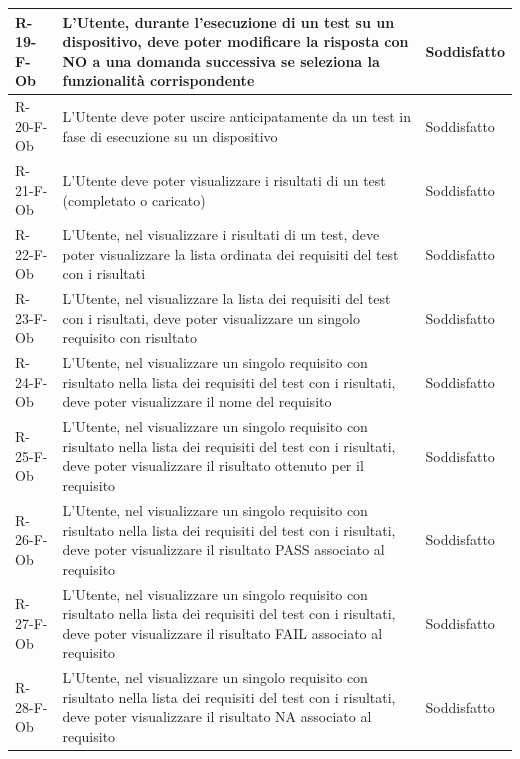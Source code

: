 \documentclass[a4paper,12pt]{article}
\begin{document}
{{\begin{longtable}{|l|p{}|p{}|}
                R-19-F-Ob       & L'Utente, durante l'esecuzione di un test su un dispositivo, deve poter modificare la risposta con NO a una domanda successiva se seleziona la funzionalità corrispondente                         & Soddisfatto \\ \hline
                R-20-F-Ob       & L'Utente deve poter uscire anticipatamente da un test in fase di esecuzione su un dispositivo                                                                                               & Soddisfatto \\ \hline
                R-21-F-Ob       & L'Utente deve poter visualizzare i risultati di un test (completato o caricato)                                                                                                             & Soddisfatto \\ \hline
                R-22-F-Ob       & L'Utente, nel visualizzare i risultati di un test, deve poter visualizzare la lista ordinata dei requisiti del test con i risultati                                                         & Soddisfatto \\ \hline
                R-23-F-Ob       & L'Utente, nel visualizzare la lista dei requisiti del test con i risultati, deve poter visualizzare un singolo requisito con risultato                                                      & Soddisfatto \\ \hline
                R-24-F-Ob       & L'Utente, nel visualizzare un singolo requisito con risultato nella lista dei requisiti del test con i risultati, deve poter visualizzare il nome del requisito                             & Soddisfatto \\ \hline
                R-25-F-Ob       & L'Utente, nel visualizzare un singolo requisito con risultato nella lista dei requisiti del test con i risultati, deve poter visualizzare il risultato ottenuto per il requisito            & Soddisfatto \\ \hline
                R-26-F-Ob       & L'Utente, nel visualizzare un singolo requisito con risultato nella lista dei requisiti del test con i risultati, deve poter visualizzare il risultato PASS associato al requisito            & Soddisfatto \\ \hline
                R-27-F-Ob       & L'Utente, nel visualizzare un singolo requisito con risultato nella lista dei requisiti del test con i risultati, deve poter visualizzare il risultato FAIL associato al requisito       & Soddisfatto \\ \hline
                R-28-F-Ob       & L'Utente, nel visualizzare un singolo requisito con risultato nella lista dei requisiti del test con i risultati, deve poter visualizzare il risultato NA associato al requisito         & Soddisfatto \\ \hline

\end{longtable}}}
\end{document}
